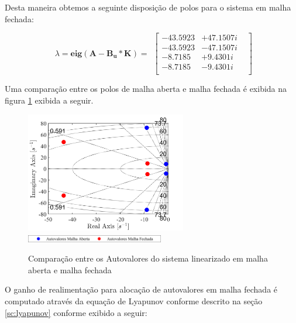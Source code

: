 \documentclass[a4paper]{ifacconf}
\begin{document}
Desta maneira obtemos a seguinte disposição de polos para o sistema em malha fechada:

\begin{equation} \label{eq:autovalores_malha_fechada}
        \begin{split}
             \lambda=\mathbf{eig(A-B_u*K)}=
        \end{split}
        \begin{bmatrix}
            -43.5923& + 47.1507i&\\
            -43.5923& - 47.1507i&\\
            -8.7185& + 9.4301i&\\
            -8.7185& - 9.4301i&\\
        \end{bmatrix}
    \end{equation}

Uma comparação entre os polos de malha aberta e malha fechada é exibida na figura \ref{fig:autovalores_malha_fechada} exibida a seguir.

    \FloatBarrier
    \begin{figure}[htbp]
        \begin{centering}
            \includegraphics[width=7cm]{img/autovalores_malha_fechada.png}
            \includegraphics[width=6cm]{img/autovalores_malha_fechada_leg.png}
            \caption{Comparação entre os Autovalores do sistema linearizado em malha aberta e malha fechada}
            \label{fig:autovalores_malha_fechada}
        \end{centering}
    \end{figure}
    \FloatBarrier
    
    O ganho de realimentação para alocação de autovalores em malha fechada é computado através da equação de Lyapunov conforme descrito na seção \ref{sc:lyapunov} conforme exibido a seguir:
    
\end{document}
